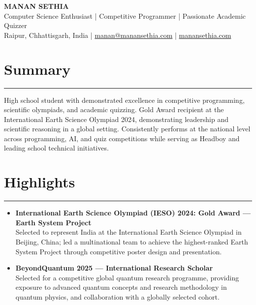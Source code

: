 \documentclass[11pt,a4paper]{article}
\newcommand{\resumesection}[1]{
  \section*{#1}
  \vspace{-4pt}
  \hrule
  \vspace{5pt}
}
\begin{document}
\vspace*{-1.2in}
\begin{tcolorbox}[
  width=\paperwidth,
  colback=headerbg,
  boxrule=0pt,
  sharp corners,
  enlarge left by=-1in,
  enlarge right by=-1in,
  top=16pt,
  bottom=16pt
]

\centering
{\Huge \bfseries \color{white} MANAN SETHIA}\\[10pt]

{\large \color{white}
Computer Science Enthusiast \;|\; Competitive Programmer \;|\; Passionate Academic Quizzer}\\[8pt]

{\color{white}
Raipur, Chhattisgarh, India \;|\;
\href{mailto:manan@manansethia.com}{manan@manansethia.com} \;|\;
\href{https://manansethia.com}{manansethia.com}}

\end{tcolorbox}

\vspace{6pt}

\resumesection{Summary}
\begin{tcolorbox}[resumebox]
High school student with demonstrated excellence in competitive programming, scientific olympiads, and academic quizzing. Gold Award recipient at the International Earth Science Olympiad 2024, demonstrating leadership and scientific reasoning in a global setting. Consistently performs at the national level across programming, AI, and quiz competitions while serving as Headboy and leading school technical initiatives.
\end{tcolorbox}

\resumesection{Highlights}
\begin{itemize}
\item \textbf{International Earth Science Olympiad (IESO) 2024: Gold Award — Earth System Project}\\
Selected to represent India at the International Earth Science Olympiad in Beijing, China; led a multinational team to achieve the highest-ranked Earth System Project through competitive poster design and presentation.

\item \textbf{BeyondQuantum 2025 — International Research Scholar}\\
Selected for a competitive global quantum research programme, providing exposure to advanced quantum concepts and research methodology in quantum physics, and collaboration with a globally selected cohort.
\end{itemize}
\end{document}
